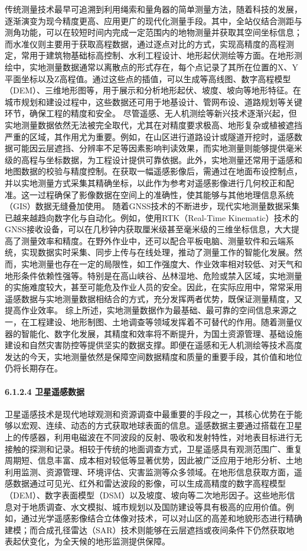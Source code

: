传统测量技术最早可追溯到利用绳索和量角器的简单测量方法，随着科技的发展，逐渐演变为现今精度更高、应用更广的现代化测量手段。其中，全站仪结合测距与测角功能，可以在较短时间内完成一定范围内的地物测量并获取其空间坐标信息；而水准仪则主要用于获取高程数据，通过逐点对比的方式，实现高精度的高程测定，常用于建筑物基础标高控制、水利工程设计、地形起伏测绘等方面。在地形测绘中，实地测量数据通常以离散点的形式存在，每个点记录了其所在位置的X、Y平面坐标以及Z高程值。通过这些点的插值，可以生成等高线图、数字高程模型（DEM）、三维地形图等，用于展示和分析地形起伏、坡度、坡向等地形特征。在城市规划和建设过程中，这些数据还可用于地基设计、管网布设、道路规划等关键环节，确保工程的精度和安全。 尽管遥感、无人机测绘等新兴技术逐渐兴起，但实地测量数据依然无法被完全取代，尤其在对精度要求极高、地形复杂或植被遮挡严重的区域，其作用尤为重要。例如，在山区进行道路设计或隧道开挖时，遥感数据可能因云层遮挡、分辨率不足等因素影响判读效果，而实地测量则能够提供毫米级的高程与坐标数据，为工程设计提供可靠依据。此外，实地测量还常用于遥感和地图数据的校验与精度控制。在获取一幅遥感影像后，需通过在地面布设控制点，并以实地测量方式采集其精确坐标，以此作为参考对遥感影像进行几何校正和配准。这一过程确保了影像数据在空间上的准确性，使其能够与其他地理信息系统（GIS）数据无缝叠加使用。 随着GNSS技术的不断进步，现代实地测量数据采集已越来越趋向数字化与自动化。例如，使用RTK（Real-Time Kinematic）技术的GNSS接收设备，可以在几秒钟内获取厘米级甚至毫米级的三维坐标信息，大大提高了测量效率和精度。在野外作业中，还可以配合平板电脑、测量软件和云端系统，实现数据实时采集、同步上传与在线处理，推动了测量工作的智能化发展。然而，实地测量也存在一定的局限性，如工作强度大、作业效率相对较低、对天气和地形条件依赖性强等。特别是在高山峡谷、丛林湿地、危险或禁入区域，实地测量的实施难度较大，甚至可能危及作业人员的安全。因此，在实际应用中，常常采用遥感数据与实地测量数据相结合的方式，充分发挥两者优势，既保证测量精度，又提高作业效率。 综上所述，实地测量数据作为最基础、最可靠的空间信息来源之一，在工程建设、地形制图、土地调查等领域发挥着不可替代的作用。随着测量仪器的智能化、数字化发展，其精度和效率将不断提升，为国土资源管理、基础设施建设和自然灾害防控等提供坚实的数据支撑。即便在遥感和无人机测绘等技术高度发达的今天，实地测量依然是保障空间数据精度和质量的重要手段，其价值和地位仍将长期存在。 \paragraph{6.1.2.4 卫星遥感数据}\label{ux536bux661fux9065ux611fux6570ux636e} 卫星遥感技术是现代地球观测和资源调查中最重要的手段之一，其核心优势在于能够以宏观、连续、动态的方式获取地球表面的信息。遥感数据主要通过搭载在卫星上的传感器，利用电磁波在不同波段的反射、吸收和发射特性，对地表目标进行无接触的探测和记录。相较于传统的地面调查方式，卫星遥感具有观测范围广、重复周期短、信息丰富、成本相对较低等显著优势，因此被广泛应用于地形分析、土地利用监测、资源管理、环境评估、灾害监测等众多领域。在地形信息获取方面，遥感数据通过可见光、红外和雷达波段的影像，可以生成高精度的数字高程模型（DEM）、数字表面模型（DSM）以及坡度、坡向等二次地形因子。这些地形信息对于地质调查、水文模拟、城市规划以及国防建设等具有极高的应用价值。例如，通过光学遥感影像结合立体像对技术，可以对山区的高差和地貌形态进行精确建模；而合成孔径雷达（SAR）技术则能够在云层遮挡或夜间条件下仍然获取地表起伏变化，为全天候的地形监测提供保障。 